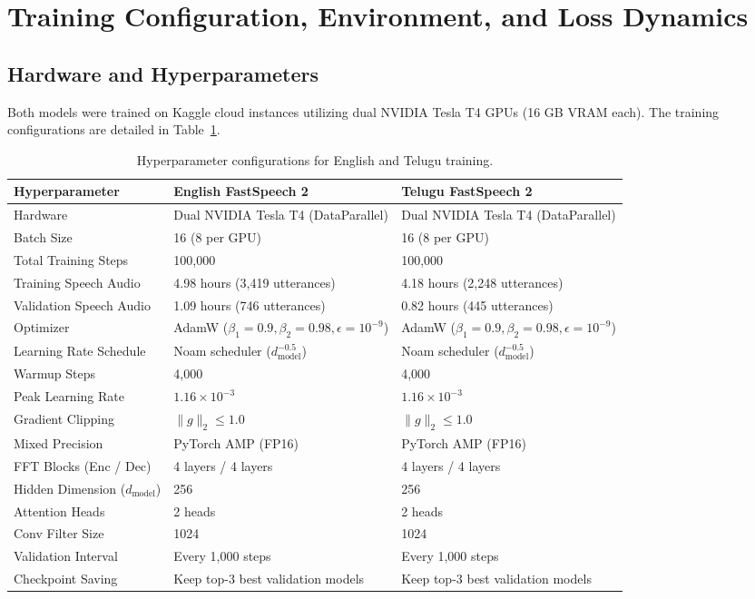\documentclass[11pt,a4paper]{article}
\begin{document}
\section{Training Configuration, Environment, and Loss Dynamics}

\subsection{Hardware and Hyperparameters}
Both models were trained on Kaggle cloud instances utilizing dual NVIDIA Tesla T4 GPUs (16 GB VRAM each). The training configurations are detailed in Table~\ref{tab:hyperparams}.

\begin{table}[H]
\centering
\caption{Hyperparameter configurations for English and Telugu training.}
\label{tab:hyperparams}
\small
\begin{tabularx}{\textwidth}{lXX}
\toprule
\textbf{Hyperparameter} & \textbf{English FastSpeech 2} & \textbf{Telugu FastSpeech 2} \\
\midrule
Hardware & Dual NVIDIA Tesla T4 (DataParallel) & Dual NVIDIA Tesla T4 (DataParallel) \\
Batch Size & 16 (8 per GPU) & 16 (8 per GPU) \\
Total Training Steps & 100,000 & 100,000 \\
Training Speech Audio & 4.98 hours (3,419 utterances) & 4.18 hours (2,248 utterances) \\
Validation Speech Audio & 1.09 hours (746 utterances) & 0.82 hours (445 utterances) \\
Optimizer & AdamW ($\beta_1=0.9, \beta_2=0.98, \epsilon=10^{-9}$) & AdamW ($\beta_1=0.9, \beta_2=0.98, \epsilon=10^{-9}$) \\
Learning Rate Schedule & Noam scheduler ($d_{\text{model}}^{-0.5}$) & Noam scheduler ($d_{\text{model}}^{-0.5}$) \\
Warmup Steps & 4,000 & 4,000 \\
Peak Learning Rate & $1.16 \times 10^{-3}$ & $1.16 \times 10^{-3}$ \\
Gradient Clipping & $\|g\|_2 \le 1.0$ & $\|g\|_2 \le 1.0$ \\
Mixed Precision & PyTorch AMP (FP16) & PyTorch AMP (FP16) \\
FFT Blocks (Enc / Dec) & 4 layers / 4 layers & 4 layers / 4 layers \\
Hidden Dimension ($d_{\text{model}}$) & 256 & 256 \\
Attention Heads & 2 heads & 2 heads \\
Conv Filter Size & 1024 & 1024 \\
Validation Interval & Every 1,000 steps & Every 1,000 steps \\
Checkpoint Saving & Keep top-3 best validation models & Keep top-3 best validation models \\
\bottomrule
\end{tabularx}
\end{table}
\end{document}
